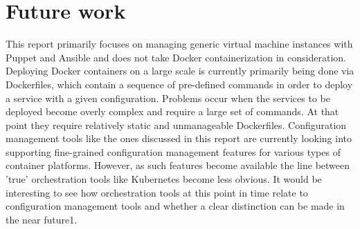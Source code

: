\section{Future work}\label{sec:futurework}
This report primarily focuses on managing generic virtual machine instances with Puppet and Ansible and does not take Docker containerization in consideration. Deploying Docker containers on a large scale is currently primarily being done via Dockerfiles, which contain a sequence of pre-defined commands in order to deploy a service with a given configuration. Problems occur when the services to be deployed become overly complex and require a large set of commands. At that point they require relatively static and unmanageable Dockerfiles. Configuration management tools like the ones discussed in this report are currently looking into supporting fine-grained configuration management features for various types of container platforms. However, as such features become available the line between 'true' orchestration tools like Kubernetes \cite{kubernetes_2016} become less obvious. It would be interesting to see how orchestration tools at this point in time relate to configuration management tools and whether a clear distinction can be made in the near future1.
